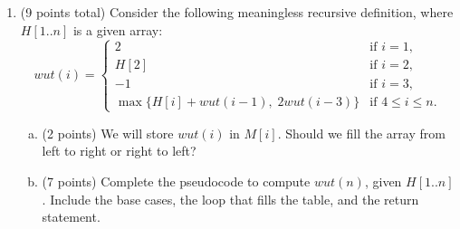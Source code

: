 \documentclass[11pt]{article}
\begin{document}
\begin{enumerate}
\textbf{Let $Ways(i)$ be the number of ways to reach bar $i$ from bar 0 using these swings.}
\begin{enumerate}[(a)]
\item (2 points) What is $Ways(4)$?
\vspace{.7in}
\item (6 points) Write the recursive definition for $Ways(i)$ for all integers $i\geq0$, including the necessary base cases. You may not need every line provided.
\begin{equation*}
Ways(i)=
\begin{cases}
\underline{\hspace{3.5in}} & \text{if } i\ \underline{\hspace{.5in}} \\
\underline{\hspace{3.5in}} & \text{if } i\ \underline{\hspace{.5in}} \\
\underline{\hspace{3.5in}} & \text{if } i\ \underline{\hspace{.5in}} \\
\underline{\hspace{3.5in}} & \text{if } i\ \underline{\hspace{.5in}} \\
\underline{\hspace{3.5in}} & \text{if } i\ \underline{\hspace{.5in}}
\end{cases}
\end{equation*}
\end{enumerate}
\newpage
\item (9 points total) Consider the following meaningless recursive definition, where $H[1..n]$ is a given array:
\[
wut(i)=\begin{cases}
2 & \text{if }i=1,\\
H[2] & \text{if }i=2,\\
-1 & \text{if }i=3,\\
\max\{H[i]+wut(i-1),\;2wut(i-3)\} & \text{if }4\leq i\leq n.
\end{cases}
\]
\begin{enumerate}[(a)]
\item (2 points) We will store $wut(i)$ in $M[i]$. Should we fill the array from left to right or right to left?
\vspace{.7in}
\item (7 points) Complete the pseudocode to compute $wut(n)$, given $H[1..n]$. Include the base cases, the loop that fills the table, and the return statement.

\end{enumerate}
\end{enumerate}
\end{document}
